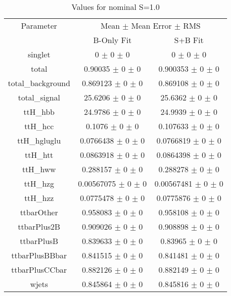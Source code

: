 \begin{table}
\centering
\caption{Values for nominal S=1.0}
\begin{tabular}{ccc}
\toprule
Parameter 	& \multicolumn{2}{c}{Mean $\pm$ Mean Error $\pm$ RMS}\\
 	& B-Only Fit & S+B Fit\\
\midrule
singlet 	& \num{0} $\pm$ \num{0} $\pm$ \num{0} 	& \num{0} $\pm$ \num{0} $\pm$ \num{0}\\
total 	& \num{0.90035} $\pm$ \num{0} $\pm$ \num{0} 	& \num{0.900353} $\pm$ \num{0} $\pm$ \num{0}\\
total\_background 	& \num{0.869123} $\pm$ \num{0} $\pm$ \num{0} 	& \num{0.869108} $\pm$ \num{0} $\pm$ \num{0}\\
total\_signal 	& \num{25.6206} $\pm$ \num{0} $\pm$ \num{0} 	& \num{25.6362} $\pm$ \num{0} $\pm$ \num{0}\\
ttH\_hbb 	& \num{24.9786} $\pm$ \num{0} $\pm$ \num{0} 	& \num{24.9939} $\pm$ \num{0} $\pm$ \num{0}\\
ttH\_hcc 	& \num{0.1076} $\pm$ \num{0} $\pm$ \num{0} 	& \num{0.107633} $\pm$ \num{0} $\pm$ \num{0}\\
ttH\_hgluglu 	& \num{0.0766438} $\pm$ \num{0} $\pm$ \num{0} 	& \num{0.0766819} $\pm$ \num{0} $\pm$ \num{0}\\
ttH\_htt 	& \num{0.0863918} $\pm$ \num{0} $\pm$ \num{0} 	& \num{0.0864398} $\pm$ \num{0} $\pm$ \num{0}\\
ttH\_hww 	& \num{0.288157} $\pm$ \num{0} $\pm$ \num{0} 	& \num{0.288278} $\pm$ \num{0} $\pm$ \num{0}\\
ttH\_hzg 	& \num{0.00567075} $\pm$ \num{0} $\pm$ \num{0} 	& \num{0.00567481} $\pm$ \num{0} $\pm$ \num{0}\\
ttH\_hzz 	& \num{0.0775478} $\pm$ \num{0} $\pm$ \num{0} 	& \num{0.0775876} $\pm$ \num{0} $\pm$ \num{0}\\
ttbarOther 	& \num{0.958083} $\pm$ \num{0} $\pm$ \num{0} 	& \num{0.958108} $\pm$ \num{0} $\pm$ \num{0}\\
ttbarPlus2B 	& \num{0.909026} $\pm$ \num{0} $\pm$ \num{0} 	& \num{0.908898} $\pm$ \num{0} $\pm$ \num{0}\\
ttbarPlusB 	& \num{0.839633} $\pm$ \num{0} $\pm$ \num{0} 	& \num{0.83965} $\pm$ \num{0} $\pm$ \num{0}\\
ttbarPlusBBbar 	& \num{0.841515} $\pm$ \num{0} $\pm$ \num{0} 	& \num{0.841481} $\pm$ \num{0} $\pm$ \num{0}\\
ttbarPlusCCbar 	& \num{0.882126} $\pm$ \num{0} $\pm$ \num{0} 	& \num{0.882149} $\pm$ \num{0} $\pm$ \num{0}\\
wjets 	& \num{0.845864} $\pm$ \num{0} $\pm$ \num{0} 	& \num{0.845816} $\pm$ \num{0} $\pm$ \num{0}\\
\bottomrule
\end{tabular}
\end{table}
